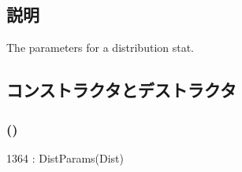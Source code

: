 \subsection{説明}
The parameters for a distribution stat. 

\subsection{コンストラクタとデストラクタ}
\hypertarget{structStats_1_1DistStor_1_1Params_a7974597e9d3c848fd265d9445f7cf8cb}{
\subsubsection[{Params}]{ ()}}
\label{structStats_1_1DistStor_1_1Params_a7974597e9d3c848fd265d9445f7cf8cb}



\begin{DoxyCode}
1364 : DistParams(Dist) {}
\end{DoxyCode}


